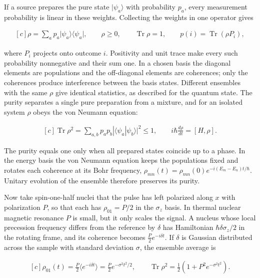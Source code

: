 \documentclass[11pt,oneside]{book}
\newenvironment{centeredalign}{\[\begin{gathered}[c]}{\end{gathered}\]}
\newcommand{\ket}[1]{\lvert #1\rangle}
\newcommand{\bra}[1]{\langle #1\rvert}
\begin{document}
If a source prepares the pure state \(\ket{\psi_a}\) with probability \(p_a\), every measurement probability is linear in these weights. Collecting the weights in one operator gives

\begin{centeredalign}
\rho=\sum_a p_a\ket{\psi_a}\bra{\psi_a},\qquad \rho\geq0,\qquad \operatorname{Tr}\rho=1,
\qquad p(i)=\operatorname{Tr}(\rho P_i),
\end{centeredalign}

where \(P_i\) projects onto outcome \(i\). Positivity and unit trace make every such probability nonnegative and their sum one. In a chosen basis the diagonal elements are populations and the off-diagonal elements are coherences; only the coherences produce interference between the basis states. Different ensembles with the same \(\rho\) give identical statistics, as described for the quantum state. The purity separates a single pure preparation from a mixture, and for an isolated system \(\rho\) obeys the von Neumann equation:

\begin{centeredalign}
\operatorname{Tr}\rho^2=\sum_{a,b}p_ap_b|\langle\psi_a|\psi_b\rangle|^2\leq1,
\qquad i\hbar\frac{d\rho}{dt}=[H,\rho].
\end{centeredalign}

The purity equals one only when all prepared states coincide up to a phase. In the energy basis the von Neumann equation keeps the populations fixed and rotates each coherence at its Bohr frequency, \(\rho_{mn}(t)=\rho_{mn}(0)e^{-i(E_m-E_n)t/\hbar}\). Unitary evolution of the ensemble therefore preserves its purity.

Now take spin-one-half nuclei that the pulse has left polarized along \(x\) with polarization \(P\), so that each has \(\rho_{01}=P/2\) in the \(\sigma_z\) basis. In thermal nuclear magnetic resonance \(P\) is small, but it only scales the signal. A nucleus whose local precession frequency differs from the reference by \(\delta\) has Hamiltonian \(\hbar\delta\sigma_z/2\) in the rotating frame, and its coherence becomes \(\tfrac P2e^{-i\delta t}\). If \(\delta\) is Gaussian distributed across the sample with standard deviation \(\sigma\), the ensemble average is

\begin{centeredalign}
\rho_{01}(t)=\tfrac P2\langle e^{-i\delta t}\rangle=\tfrac P2e^{-\sigma^2t^2/2},\qquad
\operatorname{Tr}\rho^2=\tfrac12\left(1+P^2e^{-\sigma^2t^2}\right).
\end{centeredalign}
\end{document}
